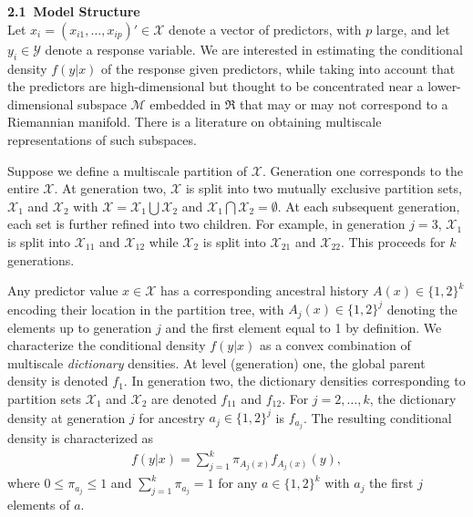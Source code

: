 \documentclass[11pt]{article}
\begin{document}
\vskip 12pt
 
{} \\ 


{} \\
{\bf 2.1\ Model Structure} \\
Let $x_i = (x_{i1},\ldots,x_{ip})' \in \mathcal{X}$ denote a vector of predictors, with $p$ large, and let $y_i \in \mathcal{Y}$ denote a response variable.  We are interested in estimating the conditional density $f(y|x)$ of the response given predictors, while taking into account that the predictors are high-dimensional but thought to be concentrated near a lower-dimensional subspace $\mathcal{M}$ embedded in $\Re$ that may or may not correspond to a Riemannian manifold.  There is a literature on obtaining multiscale representations of such subspaces.  

Suppose we define a multiscale partition of $\mathcal{X}$.  Generation one corresponds to the entire $\mathcal{X}$.  At generation two, $\mathcal{X}$ is split into two mutually exclusive partition sets, $\mathcal{X}_1$ and $\mathcal{X}_2$ with $\mathcal{X} = \mathcal{X}_1 \bigcup \mathcal{X}_2$ and $\mathcal{X}_1 \bigcap \mathcal{X}_2 = \emptyset$.  At each subsequent generation, each set is further refined into two children.  For example, in generation $j=3$, $\mathcal{X}_1$ is split into $\mathcal{X}_{11}$ and $\mathcal{X}_{12}$ while $\mathcal{X}_2$ is split into $\mathcal{X}_{21}$ and $\mathcal{X}_{22}$.  This proceeds for $k$ generations.

Any predictor value $x \in \mathcal{X}$ has a corresponding ancestral history $A(x) \in \{1,2\}^k$ encoding their location in the partition tree, with $A_j(x) \in \{1,2\}^j$ denoting the elements up to generation $j$ and the first element equal to 1 by definition. We characterize the conditional density $f(y|x)$ as a convex combination of multiscale {\em dictionary} densities.  At level (generation) one, the global parent density is denoted $f_1$. In generation two, the dictionary densities corresponding to partition sets $\mathcal{X}_1$ and $\mathcal{X}_2$ are denoted $f_{11}$ and $f_{12}$.  For $j=2,\ldots,k$, the dictionary density at generation $j$ for ancestry $a_j \in \{1,2\}^j$ is $f_{a_j}$.  The resulting conditional density is characterized as 
\begin{eqnarray}
f(y|x) = \sum_{j=1}^k \pi_{A_j(x)} f_{A_j(x)}(y),  \label{eq:base}
\end{eqnarray}
where $0 \le \pi_{a_j} \le 1$ and $\sum_{j=1}^k \pi_{a_j}=1$ for any $a \in \{1,2\}^k$ with $a_j$ the first $j$ elements of $a$.
\end{document}
